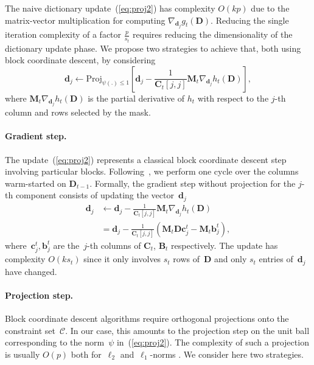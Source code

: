 \documentclass{article}
\def\c{{\mathbf c}}
\def\B{{\mathbf B}}
\def\b{{\mathbf b}}
\def\C{{\mathbf C}}
\def\D{{\mathbf D}}
\def\d{{\mathbf d}}
\def\b{{\mathbf b}}
\def\M{{\mathbf M}}
\begin{document}
The naive dictionary update~(\ref{eq:proj2}) has complexity $O(kp)$ due to the
matrix-vector multiplication for computing $\nabla_{\d_j} g_t(\D)$.
Reducing the single iteration complexity of a
factor $\frac{p}{s_t}$ requires reducing the dimensionality of the
dictionary update phase.
We propose two strategies to achieve that, both using block
coordinate descent, by considering
\begin{equation}
   \d_j  \leftarrow   \text{Proj}_{\psi(.) \leq 1} \left[ \d_j - \frac{1}{\C_t[j,j]} \M_t\nabla_{\d_j}h_t(\D)\right],\label{eq:proj2}
\end{equation}
where $\M_t\nabla_{\d_j}h_t(\D)$ is the partial derivative of $h_t$
with respect to the $j$-th column and rows selected by the mask.


\paragraph{Gradient step.}
The update~(\ref{eq:proj2}) represents a classical block coordinate descent step involving particular blocks.
Following~\citet{mairal_online_2010}, we perform one cycle over the columns warm-started on
$\D_{t-1}$.
Formally, the gradient step without projection for the $j$-th component consists of updating the vector~$\d_j$
\begin{equation}
   \begin{split}
      \d_j & \gets \d_j - \frac{1}{\C_t[j,j]} \M_t\nabla_{\d_j}h_t(\D) \\
           & = \d_j - \frac{1}{\C_t[j,j]}(\M_t\D\c_j^t - \M_t\b_j^t),
   \end{split}\label{eq:gradientstep}
\end{equation}
where~$\c_j^t, \b_j^t$ are the~$j$-th  columns of $\C_t$, $\B_t$ respectively.
The update has complexity $O(k s_t)$ since it only involves $s_t$ rows of~$\D$ and only $s_t$ entries of~$\d_j$
have changed.

\paragraph{Projection step.}
Block coordinate descent algorithms require orthogonal
projections onto the constraint set~$\mathcal C$.  In our case, this amounts to
the projection step on the unit ball corresponding to the norm~$\psi$
in~(\ref{eq:proj2}).  The complexity of such a projection is usually $O(p)$
both for~$\ell_2$ and~$\ell_1$-norms \citep[see][]{duchi_efficient_2008}.
We consider here two strategies.
\end{document}
